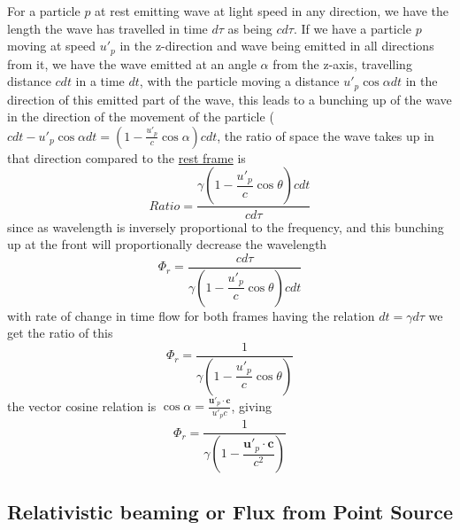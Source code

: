 For a particle $p$ at rest emitting wave at light speed in any direction, we have the length the wave has travelled in time $d\tau$ as being $cd\tau$.
If we have a particle $p$ moving at speed $u'_p$ in the z-direction and wave being emitted in all directions from it, we have the wave emitted at an angle $\alpha$ from the z-axis, travelling distance $cdt$ in a time $dt$, with the particle moving a distance $ u'_p \cos\alpha dt$ in the direction of this emitted part of the wave, this leads to a bunching up of the wave in the direction of the movement of the particle ($cdt - u'_p \cos\alpha dt= (1-\frac{u'_p}{c}\cos\alpha)cdt$, the ratio of space the wave takes up in that direction compared to the \hyperlink{def-proper-frame}{rest frame} is 
\begin{equation}
    Ratio = \frac{ \gamma \left(1-\dfrac{u'_p}{c}  \cos\theta \right) c dt}{c d\tau}
\end{equation}
since as wavelength is inversely proportional to the frequency, and this bunching up at the front will proportionally decrease the wavelength
\begin{equation}
    \Phi_r = \frac{c d\tau}{ \gamma \left(1-\dfrac{u'_p}{c}  \cos\theta \right) c dt} 
\end{equation}
with rate of change in time flow for both frames having the relation $dt=\gamma d\tau$ we get the ratio of this
\begin{equation}
    \Phi_r = \frac{1}{ \gamma \left(1-\dfrac{u'_p}{c}  \cos\theta \right)} 
\end{equation}
the vector cosine relation is $\cos\alpha = \frac{\mathbf{u}'_p \cdot \mathbf{c}}{u'_p c}$, giving 
\begin{equation}
    \Phi_r = \frac{1}{ \gamma \left(1-\dfrac{\mathbf{u}'_p \cdot \mathbf{c}}{ c^2} \right)} 
\end{equation}
\subsection{Relativistic beaming or Flux from Point Source}

